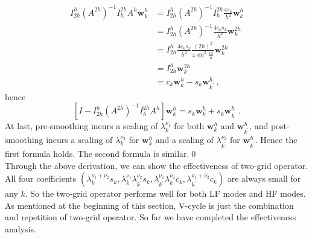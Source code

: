 \documentclass[a4paper,twocolumn]{article}
\theoremstyle{definition}
\begin{document}
$$
\begin{aligned}
I_{2 h}^{h} \left(A^{2 h}\right)^{-1} I_{h}^{2 h} A^{h} \mathbf{w}_{k}^{h}&=
I_{2 h}^{h} \left(A^{2 h}\right)^{-1} I_{h}^{2 h} \frac{4 s_{k}}{h^{2}} \mathbf{w}_{k}^{h}\\
&=I_{2 h}^{h} \left(A^{2 h}\right)^{-1} \frac{4 c_{k}s_{k}}{h^{2}} \mathbf{w}_{k}^{2h}\\
&=I_{2 h}^{h} \frac{4 c_{k} s_{k}}{h^{2}} \frac{(2 h)^{2}}{4 \sin ^{2} \frac{k \pi}{n}} \mathbf{w}_{k}^{2 h} \\
&=I_{2 h}^{h} \mathbf{w}_{k}^{2 h} \\
&=c_{k} \mathbf{w}_{k}^{h}-s_{k} \mathbf{w}_{k^{\prime}}^{h} \ ,
\end{aligned}
$$
hence
$$
\left[I-I_{2 h}^{h}\left(A^{2 h}\right)^{-1} I_{h}^{2 h} A^{h}\right] \mathbf{w}_{k}^{h}=s_{k} \mathbf{w}_{k}^{h}+s_{k} \mathbf{w}_{k^{\prime}}^{h} \ .
$$
At last, pre-smoothing incurs a scaling of $\lambda_{k}^{\nu_{1}}$ for both $\mathbf{w}_{k}^{h}$ and $\mathbf{w}_{k^{\prime}}^{h}$, and post-smoothing incurs a scaling of $\lambda_{k}^{\nu_{2}}$ for $\mathbf{w}_{k}^{h}$ and a scaling of $\lambda_{k^{\prime}}^{\nu_{2}}$ for $\mathbf{w}_{k^{\prime}}^{h}$. Hence the first formula holds. The second formula is similar.\qed \\
Through the above derivation, we can show the effectiveness of two-grid operator. All four coefficients $(\lambda_{k}^{\nu_{1}+\nu_{2}} s_{k},\lambda_{k}^{\nu_{1}}\lambda_{k^{\prime}}^{\nu_{2}} s_{k},\lambda_{k^{\prime}}^{\nu_{1}} \lambda_{k}^{\nu_{2}} c_{k},\lambda_{k^{\prime}}^{\nu_{1}+\nu_{2}} c_{k})$ are always small for any $k$. So the two-grid operator performs well for both LF modes and HF modes.\\
As mentioned at the beginning of this section, V-cycle is just the combination and repetition of two-grid operator. So far we have completed the effectiveness analysis.
\end{document}
